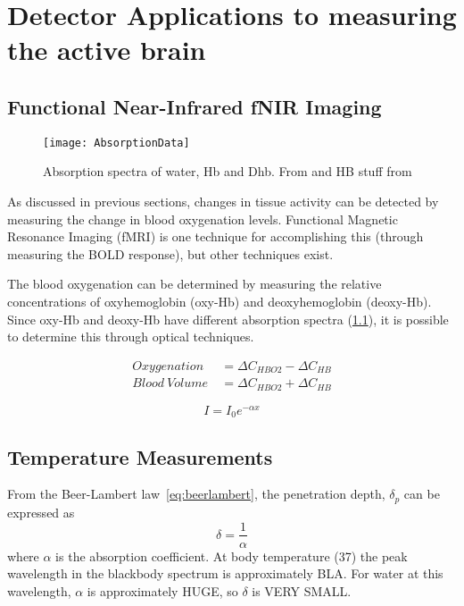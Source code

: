 \chapter{Detector Applications to measuring the active brain}

\section{{F}unctional {N}ear-{I}nfrared {fNIR} Imaging}
\begin{figure}[b]
  \begin{center}
    \texttt{[image: AbsorptionData]}
    \caption[Absorption spectra of water, deoxyhemoglobin and oxyhemoblogin]{\label{fig:fnirabsorption} Absorption spectra of water, Hb and Dhb.  From \citet{cope} and HB stuff from \citet{horecker} }
  \end{center}
\end{figure}

As discussed in previous sections, changes in tissue activity can be detected by measuring the change in blood oxygenation levels.  Functional Magnetic Resonance Imaging (fMRI) is one technique for accomplishing this (through measuring the BOLD response), but other techniques exist.  

The blood oxygenation can be determined by measuring the relative concentrations of oxyhemoglobin (oxy-Hb) and deoxyhemoglobin (deoxy-Hb).  Since oxy-Hb and deoxy-Hb have different absorption spectra (\cref{fig:fnirabsorption}), it is possible to determine this through optical techniques.

\begin{align}
  \label{eq:o2bloodvolume}
  Oxygenation\ &= \Delta C_{HBO2} - \Delta C_{HB} \nonumber \\
  Blood\ Volume\ &= \Delta C_{HBO2} + \Delta C_{HB} 
\end{align}

\begin{equation}
  I = I_0 e^{-\alpha x} \label{eq:beerlambert}
\end{equation}


\section{Temperature Measurements}


From the Beer-Lambert law~\cref{eq:beerlambert}, the penetration depth, $\delta_{p}$ can be expressed as 
\begin{equation}
  \delta = \frac{1}{\alpha} \label{eq:penetrationdepth}
\end{equation}
where $\alpha$ is the absorption coefficient.  At body temperature (37\degree) the peak wavelength in the blackbody spectrum is approximately BLA.  For water at this wavelength, $\alpha$ is approximately HUGE, so $\delta$ is VERY SMALL. 